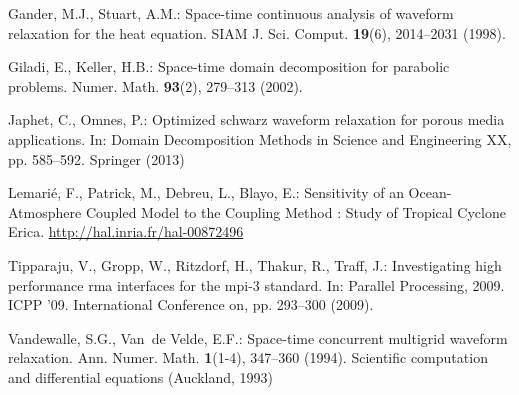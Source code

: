 \documentclass{svmult-ddm}
\begin{document}
\begin{thebibliography}{10}
Gander, M.J., Stuart, A.M.: Space-time continuous analysis of waveform
  relaxation for the heat equation.
\newblock SIAM J. Sci. Comput. \textbf{19}(6), 2014--2031 (1998).
\newblock {}

Giladi, E., Keller, H.B.: Space-time domain decomposition for parabolic
  problems.
\newblock Numer. Math. \textbf{93}(2), 279--313 (2002).
\newblock {}

Japhet, C., Omnes, P.: Optimized schwarz waveform relaxation for porous media
  applications.
\newblock In: Domain Decomposition Methods in Science and Engineering XX, pp.
  585--592. Springer (2013)

Lemari{\'e}, F., Patrick, M., Debreu, L., Blayo, E.: {Sensitivity of an
  Ocean-Atmosphere Coupled Model to the Coupling Method : Study of Tropical
  Cyclone Erica}.
\newblock \urlprefix\url{http://hal.inria.fr/hal-00872496}

Tipparaju, V., Gropp, W., Ritzdorf, H., Thakur, R., Traff, J.: Investigating
  high performance rma interfaces for the mpi-3 standard.
\newblock In: Parallel Processing, 2009. ICPP '09. International Conference on,
  pp. 293--300 (2009).
\newblock {}

Vandewalle, S.G., Van~de Velde, E.F.: Space-time concurrent multigrid waveform
  relaxation.
\newblock Ann. Numer. Math. \textbf{1}(1-4), 347--360 (1994).
\newblock Scientific computation and differential equations (Auckland, 1993)

\end{thebibliography}
\end{document}
